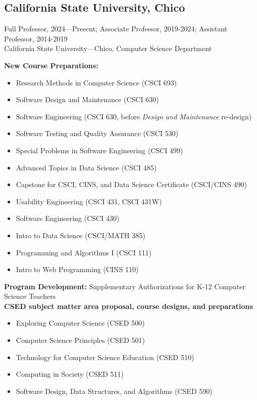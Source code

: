 \documentclass[10pt,letterpaper]{article}
\begin{document}
\subsection*{California State University, Chico}
Full Professor, 2024---Present; Associate Professor, 2019-2024; Assistant Professor, 2014-2019 \\
California State University---Chico, Computer Science Department
\par \small\textbf{New Course Preparations:}
\begin{itemize}[leftmargin=1.5em]
\item Research Methods in Computer Science (CSCI 693)
\item Software Design and Maintenance (CSCI 630)
\item Software Engineering (CSCI 630, before \textit{Design and Maintenance} re-design)
\item Software Testing and Quality Assurance (CSCI 530)
\item Special Problems in Software Engineering (CSCI 499)
\item Advanced Topics in Data Science (CSCI 485)
\item Capstone for CSCI, CINS, and Data Science Certificate (CSCI/CINS 490)
\item Usability Engineering (CSCI 431, CSCI 431W)
\item Software Engineering (CSCI 430)
\item Intro to Data Science (CSCI/MATH 385)
\item Programming and Algorithms I (CSCI 111)
\item Intro to Web Programming (CINS 110)
\end{itemize}

\par \small\textbf{Program Development:} Supplementary Authorizations for K-12 Computer Science Teachers \\
\small\textbf{CSED subject matter area proposal, course designs, and preparations}
\begin{itemize}[leftmargin=1.5em]
\item Exploring Computer Science (CSED 500)
\item Computer Science Principles (CSED 501)
\item Technology for Computer Science Education (CSED 510)
\item Computing in Society (CSED 511)
\item Software Design, Data Structures, and Algorithms (CSED 590)
\end{itemize}
\end{document}
